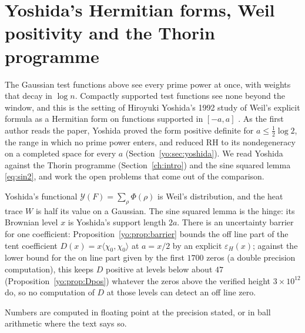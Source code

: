 \section*{Yoshida's Hermitian forms, Weil positivity and the Thorin programme}\label{chap:yoshida}\label{yo:chapter}

The Gaussian test functions above see every prime power at once, with weights that decay in $\log n$. Compactly supported test functions see none beyond the window, and this is the setting of Hiroyuki Yoshida's 1992 study of Weil's explicit formula as a Hermitian form on functions supported in $[-a,a]$ \cite{Yoshida92}. As the first author reads the paper, Yoshida proved the form positive definite for $a\le\frac12\log2$, the range in which no prime power enters, and reduced RH to its nondegeneracy on a completed space for every $a$ (Section~\ref{yo:sec:yoshida}). We read Yoshida against the Thorin programme (Section~\ref{ch:intro}) and the sine squared lemma \eqref{eq:sin2}, and work the open problems that come out of the comparison.

Yoshida's functional $\mathcal Y(F)=\sum_\rho\Phi(\rho)$ is Weil's distribution, and the heat trace $W$ is half its value on a Gaussian. The sine squared lemma is the hinge: its Brownian level $x$ is Yoshida's support length $2a$. There is an uncertainty barrier for one coefficient: Proposition~\ref{yo:prop:barrier} bounds the off line part of the tent coefficient $D(x)=x\langle\chi_0,\chi_0\rangle$ at $a=x/2$ by an explicit $\varepsilon_H(x)$; against the lower bound for the on line part given by the first $1700$ zeros (a double precision computation), this keeps $D$ positive at levels below about $47$ (Proposition~\ref{yo:prop:Dpos}) whatever the zeros above the verified height $3\times10^{12}$ \cite{PT21} do, so no computation of $D$ at those levels can detect an off line zero.

Numbers are computed in floating point at the precision stated, or in ball arithmetic where the text says so.
